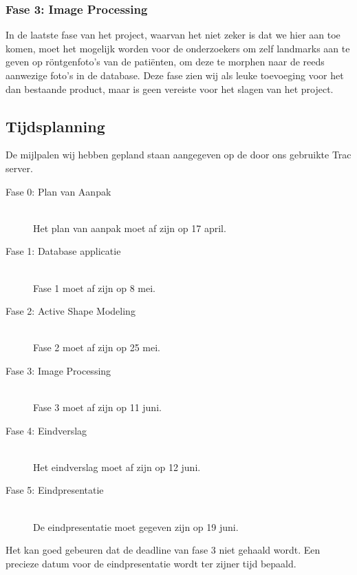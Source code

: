 \subsubsection{Fase 3: Image Processing}
In de laatste fase van het project, waarvan het niet zeker is dat we hier aan toe komen, moet het mogelijk worden voor de onderzoekers om zelf landmarks aan te geven op r\"ontgenfoto's van de pati\"enten, om deze te morphen naar de reeds aanwezige foto's in de database. Deze fase zien wij als leuke toevoeging voor het dan bestaande product, maar is geen vereiste voor het slagen van het project.

\subsection{Tijdsplanning}




De mijlpalen wij hebben gepland staan aangegeven op de door ons gebruikte Trac\cite{trac} server.
\begin{description}
	\item[Fase 0: Plan van Aanpak]\hspace*{\fill} \\
Het plan van aanpak moet af zijn op 17 april.

	\item[Fase 1: Database applicatie]\hspace*{\fill} \\
Fase 1 moet af zijn op 8 mei.

	\item[Fase 2: Active Shape Modeling]\hspace*{\fill} \\
Fase 2 moet af zijn op 25 mei.

	\item[Fase 3: Image Processing]\hspace*{\fill} \\
Fase 3 moet af zijn op 11 juni.

	\item[Fase 4: Eindverslag]\hspace*{\fill} \\
Het eindverslag moet af zijn op 12 juni.

	\item[Fase 5: Eindpresentatie]\hspace*{\fill} \\
De eindpresentatie moet gegeven zijn op 19 juni.

\end{description}
Het kan goed gebeuren dat de deadline van fase 3 niet gehaald wordt.
Een precieze datum voor de eindpresentatie wordt ter zijner tijd bepaald.

